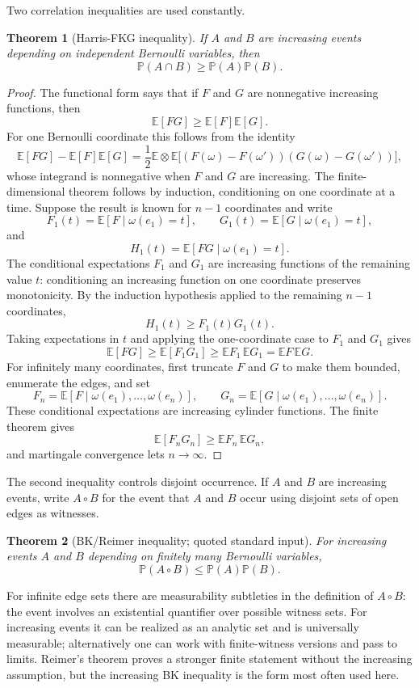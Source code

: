 \documentclass[11pt,reqno]{book}
\numberwithin{equation}{chapter}
\theoremstyle{plain}
\newtheorem{theorem}{Theorem}[chapter]
\theoremstyle{definition}
\theoremstyle{remark}
\renewcommand{\P}{\mathbb P}
\newcommand{\E}{\mathbb E}
\newcommand{\1}{\mathbf 1}
\begin{document}
Two correlation inequalities are used constantly.

\begin{theorem}[Harris-FKG inequality]
If $A$ and $B$ are increasing events depending on independent Bernoulli variables, then
\[
  \P(A\cap B)\geq \P(A)\P(B).
\]
\end{theorem}

\begin{proof}
The functional form says that if $F$ and $G$ are nonnegative increasing functions, then
\[
  \E[FG]\geq \E[F]\E[G].
\]
For one Bernoulli coordinate this follows from the identity
\[
  \E[FG]-\E[F]\E[G]
  =
  \frac12\E\otimes\E
  \bigl[(F(\omega)-F(\omega'))(G(\omega)-G(\omega'))\bigr],
\]
whose integrand is nonnegative when $F$ and $G$ are increasing. The
finite-dimensional theorem follows by induction, conditioning on one
coordinate at a time. Suppose the result is known for \(n-1\) coordinates and
write
\[
  F_1(t)=\E[F\mid \omega(e_1)=t],
  \qquad
  G_1(t)=\E[G\mid \omega(e_1)=t],
\]
and
\[
  H_1(t)=\E[FG\mid \omega(e_1)=t].
\]
The conditional expectations \(F_1\) and \(G_1\) are increasing functions of
the remaining value \(t\): conditioning an increasing function on one
coordinate preserves monotonicity. By the induction hypothesis applied to the
remaining \(n-1\) coordinates,
\[
  H_1(t)\geq F_1(t)G_1(t).
\]
Taking expectations in \(t\) and applying the one-coordinate case to
\(F_1\) and \(G_1\) gives
\[
  \E[FG]\geq \E[F_1G_1]\geq \E F_1\,\E G_1=\E F\,\E G.
\]
For infinitely many coordinates, first truncate \(F\) and \(G\) to make them
bounded, enumerate the edges, and set
\[
  F_n=\E[F\mid \omega(e_1),\ldots,\omega(e_n)],
  \qquad
  G_n=\E[G\mid \omega(e_1),\ldots,\omega(e_n)].
\]
These conditional expectations are increasing cylinder functions. The
finite theorem gives
\[
  \E[F_nG_n]\geq\E F_n\,\E G_n,
\]
and martingale convergence lets \(n\to\infty\).
\end{proof}

The second inequality controls disjoint occurrence. If $A$ and $B$ are increasing events, write $A\circ B$ for the event that $A$ and $B$ occur using disjoint sets of open edges as witnesses.

\begin{theorem}[BK/Reimer inequality; quoted standard input]
For increasing events $A$ and $B$ depending on finitely many Bernoulli variables,
\[
  \P(A\circ B)\leq \P(A)\P(B).
\]
\end{theorem}

For infinite edge sets there are measurability subtleties in the definition of $A\circ B$: the event involves an existential quantifier over possible witness sets. For increasing events it can be realized as an analytic set and is universally measurable; alternatively one can work with finite-witness versions and pass to limits. Reimer's theorem proves a stronger finite statement without the increasing assumption, but the increasing BK inequality is the form most often used here.
\end{document}
